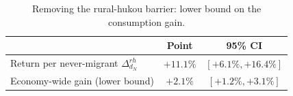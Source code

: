 \begin{table}[htbp]
\centering
\caption{Removing the rural-hukou barrier: lower bound on the consumption gain.}
\label{tab:hukou_bound}
\begin{tabular}{lcc}
\toprule
 & Point & 95\% CI \\
\midrule
Return per never-migrant $\Delta_{d_N}^{rh}$ & $+11.1\%$ & $[+6.1\%, +16.4\%]$ \\
Economy-wide gain (lower bound) & $+2.1\%$ & $[+1.2\%, +3.1\%]$ \\
\bottomrule
\end{tabular}
\end{table}
